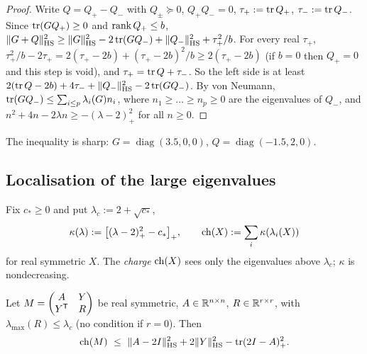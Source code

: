 \begin{proof}
Write $Q=Q_+-Q_-$ with $Q_\pm\succeq0$, $Q_+Q_-=0$, $\tau_+:=\operatorname{tr} Q_+$, $\tau_-:=\operatorname{tr} Q_-$. Since $\operatorname{tr}(GQ_+)\ge0$ and $\operatorname{rank} Q_+\le b$,
$\lVert G+Q\rVert_{\mathrm{HS}}^2\ge\lVert G\rVert_{\mathrm{HS}}^2-2\operatorname{tr}(GQ_-)+\lVert Q_-\rVert_{\mathrm{HS}}^2+\tau_+^2/b$. For every real $\tau_+$,
$\tau_+^2/b-2\tau_+=2(\tau_+-2b)+(\tau_+-2b)^2/b\ge2(\tau_+-2b)$ (if $b=0$ then $Q_+=0$ and this step is void), and $\tau_+=\operatorname{tr} Q+\tau_-$. So the left
side is at least $2(\operatorname{tr} Q-2b)+4\tau_-+\lVert Q_-\rVert_{\mathrm{HS}}^2-2\operatorname{tr}(GQ_-)$. By von Neumann, $\operatorname{tr}(GQ_-)\le\sum_{i\le p}\lambda_i(G)n_i$, where $n_1\ge\dots\ge n_p\ge0$
are the eigenvalues of $Q_-$, and $n^2+4n-2\lambda n\ge-(\lambda-2)_+^2$ for all $n\ge0$.
\end{proof}

The inequality is sharp: $G=\operatorname{diag}(3.5,0,0)$, $Q=\operatorname{diag}(-1.5,2,0)$.

\subsection{Localisation of the large eigenvalues}
Fix $c_*\ge0$ and put $\lambda_c:=2+\sqrt{c_*}$,
\[
\kappa(\lambda):=\big[(\lambda-2)_+^2-c_*\big]_+,\qquad \operatorname{ch}(X):=\sum_i\kappa(\lambda_i(X))
\]
for real symmetric $X$. The \emph{charge} $\operatorname{ch}(X)$ sees only the eigenvalues above $\lambda_c$; $\kappa$ is nondecreasing.

\begin{theorem}[Localisation]\label{thm:loc}
Let $M=\begin{pmatrix}A&Y\\Y^{\mathsf T}&R\end{pmatrix}$ be real symmetric, $A\in\mathbb R^{n\times n}$, $R\in\mathbb R^{r\times r}$, with $\lambda_{\max}(R)\le\lambda_c$
\textup{(}no condition if $r=0$\textup{)}. Then
\[
\ch(M)\ \le\ \HS{A-2I}^2+2\HS Y^2-\tr(2I-A)_+^2 .
\]
\end{theorem}

